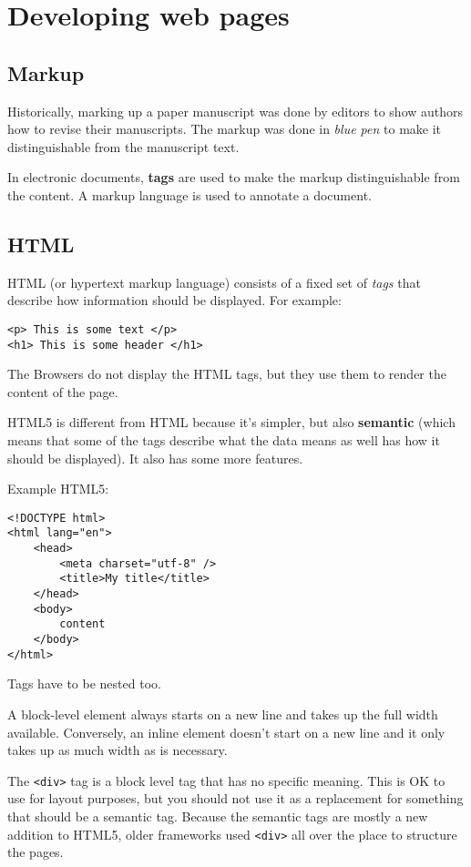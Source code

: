 \documentclass[11pt,a4paper,titlepage,dvipsnames,cmyk]{scrartcl}
\begin{document}
\section{Developing web pages}%
\label{sec:web-pages}

\subsection{Markup}%
\label{sub:Markup}
Historically, marking up a paper manuscript was done by editors to show
authors how to revise their manuscripts. The markup was done in
\textit{blue pen} to make it distinguishable from the manuscript text.

In electronic documents, \textbf{tags} are used to make the markup
distinguishable from the content. A markup language is used to annotate a
document.

\subsection{HTML}%
\label{sub:HTML}
HTML (or hypertext markup language) consists of a fixed set of
\textit{tags} that describe how information should be displayed. For
example:
\begin{lstlisting}[style=B]
<p> This is some text </p>
<h1> This is some header </h1>
\end{lstlisting}

The Browsers do not display the HTML tags, but they use them to render the
content of the page.

HTML5 is different from HTML because it's simpler, but also \textbf{semantic}
(which means that some of the tags describe what the data means as well
has how it should be displayed). It also has some more features.

Example HTML5:
\begin{lstlisting}[style=B]
<!DOCTYPE html>
<html lang="en">
    <head>
        <meta charset="utf-8" />
        <title>My title</title>
    </head>
    <body>
        content
    </body>
</html>
\end{lstlisting}

Tags have to be nested too.

A block-level element always starts on a new line and takes up the full
width available. Conversely, an inline element doesn't start on a new line
and it only takes up as much width as is necessary.

The \lstinline|<div>| tag is a block level tag that has no specific
meaning. This is OK to use for layout purposes, but you should not use it
as a replacement for something that should be a semantic tag. Because the
semantic tags are mostly a new addition to HTML5, older frameworks used
\lstinline|<div>| all over the place to structure the pages.
\end{document}
